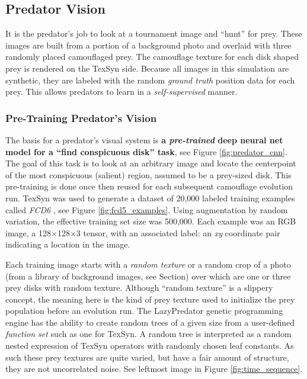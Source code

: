 \documentclass[letterpaper]{article}
\newcommand{\jargon}[1]{\textit{#1}}
\newcommand{\texsyn}[0]{TexSyn}
\newcommand{\lazypredator}[0]{LazyPredator}
\begin{document}
\subsection{Predator Vision}
\label{subsec:predator_vision}
It is the predator's job to look at a tournament image and “hunt” for prey. These images are built from a portion of a background photo and overlaid with three randomly placed camouflaged prey. The camouflage texture for each disk shaped prey is rendered on the \texsyn{} side. Because all images in this simulation are synthetic, they are labeled with the random \jargon{ground truth} position data for each prey. This allows predators to learn in a \jargon{self-supervised} manner.
\par


\subsubsection{Pre-Training Predator's Vision}
\label{sec:pre_train_predator}
The basis for a predator's visual system is \textbf{a \jargon{pre-trained} deep neural net model for a “find conspicuous disk” task}, see Figure \ref{fig:predator_cnn}. The goal of this task is to look at an arbitrary image and locate the centerpoint of the most conspicuous (salient) region, assumed to be a prey-sized disk. This pre-training is done once then reused for each subsequent camouflage evolution run. \texsyn{} was used to generate a dataset of 20,000 labeled training examples called \jargon{FCD6} \citep{reynolds_FCD6_2022}, see Figure \ref{fig:fcd5_examples}. Using augmentation by random variation, the effective training set size was 500,000. Each example was an RGB image, a 128$\times$128$\times$3 tensor, with an associated label: an \textit{xy} coordinate pair indicating a location in the image.
\par
Each training image starts with a \jargon{random texture} or a random crop of a photo (from a library of background images, see Section) over which are one or three prey disks with random texture. Although “random texture” is a slippery concept, the meaning here is the kind of prey texture used to initialize the prey population before an evolution run. The \lazypredator{} genetic programming engine has the ability to create random trees of a given size from a user-defined \jargon{function set} such as one for \texsyn{}. A random tree is interpreted as a random nested expression of \texsyn{} operators with randomly chosen leaf constants. As such these prey textures are quite varied, but have a fair amount of structure, they are not uncorrelated noise. See leftmost image in Figure \ref{fig:time_sequence}.
\par
\end{document}
